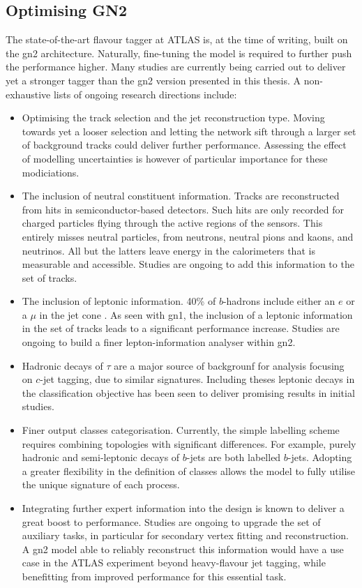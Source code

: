 
\subsection{Optimising GN2}\label{chap-GN2Opt}
The state-of-the-art flavour tagger at ATLAS is, at the time of writing, built on the \gls{gn2} architecture. Naturally, fine-tuning the model is required to further push the performance higher. Many studies are currently being carried out to deliver yet a stronger tagger than the \gls{gn2} version presented in this thesis. A non-exhaustive lists of ongoing research directions include: 
\begin{itemize}
  \item Optimising the track selection and the jet reconstruction type. Moving towards yet a looser selection and letting the network sift through a larger set of background tracks could deliver further performance. Assessing the effect of modelling uncertainties is however of particular importance for these modiciations.
  \item The inclusion of neutral constituent information. Tracks are reconstructed from hits in semiconductor-based detectors. Such hits are only recorded for charged particles flying through the active regions of the sensors. This entirely misses neutral particles, from neutrons, neutral pions and kaons, and neutrinos. All but the latters leave energy in the calorimeters that is measurable and accessible. Studies are ongoing to add this information to the set of tracks. 
  \item The inclusion of leptonic information. 40\% of $b$-hadrons include either an $e$ or a $\mu$ in the jet cone \cite{Tanabashi:2018oca}. As seen with \gls{gn1}, the inclusion of a leptonic information in the set of tracks leads to a significant performance increase. Studies are ongoing to build a finer lepton-information analyser within \gls{gn2}.
  \item Hadronic decays of $\tau$ are a major source of backgrounf for analysis focusing on $c$-jet tagging, due to similar signatures. Including theses leptonic decays in the classification objective has been seen to deliver promising results in initial studies. 
  \item Finer output classes categorisation. Currently, the simple labelling scheme requires combining topologies with significant differences. For example, purely hadronic and semi-leptonic decays of $b$-jets are both labelled $b$-jets. Adopting a greater flexibility in the definition of classes allows the model to fully utilise the unique signature of each process. 
  \item Integrating further expert information into the design is known to deliver a great boost to performance. Studies are ongoing to upgrade the set of auxiliary tasks, in particular for secondary vertex fitting and reconstruction. A \gls{gn2} model able to reliably reconstruct this information would have a use case in the ATLAS experiment beyond heavy-flavour jet tagging, while benefitting from improved performance for this essential task.  
\end{itemize}

